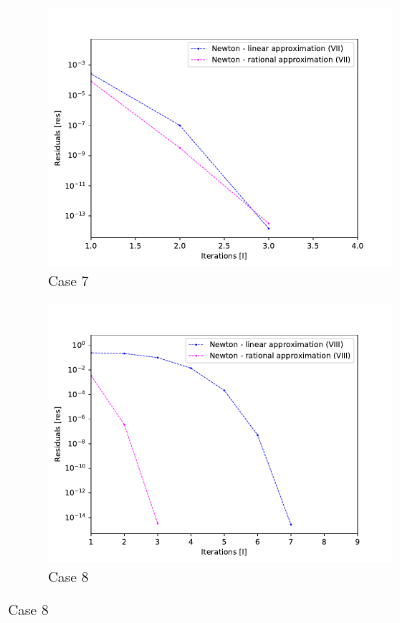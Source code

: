 \documentclass[11pt, oneside]{article}
\begin{document}
	\begin{figure}
		\centering
		\begin{subfigure}[b]{.45\linewidth}
			\includegraphics[width=\linewidth]{figure/7.pdf}
			\caption{Case 7}
		\end{subfigure}
		\begin{subfigure}[b]{.45\linewidth}
			\includegraphics[width=\linewidth]{figure/8.pdf}
			\caption{Case 8}
		\end{subfigure}
		


\end{figure}
\end{document}
